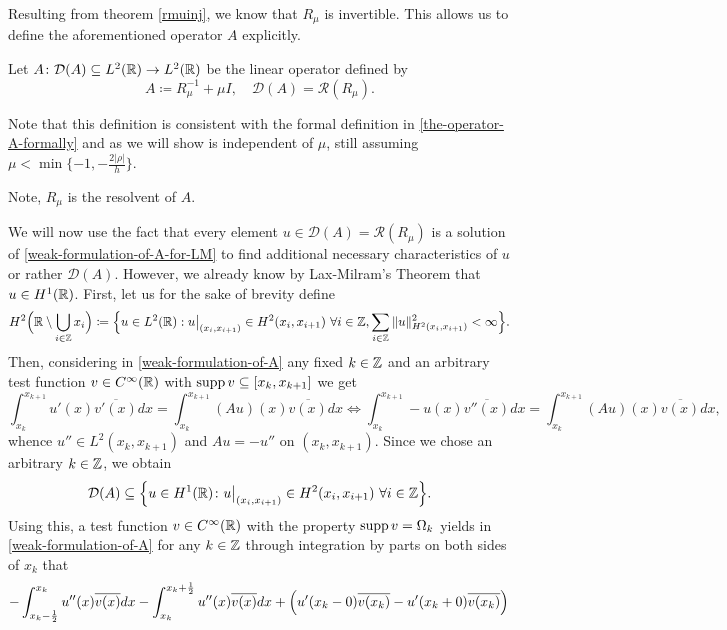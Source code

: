 Resulting from theorem \ref{rmuinj}, we know that $R_{\mu}$ is invertible. This allows us to define the aforementioned operator $A$ explicitly.
\begin{definition}
	Let $A \colon \mathcal{D}(A) \subseteq L^{2}(\mathbb{R}) \rightarrow L^{2}(\mathbb{R})$ be the linear operator defined by
	\[ A \coloneqq R_{\mu}^{-1} + \mu I, \quad \mathcal{D}(A) = \mathcal{R}(R_{\mu}). \]
\end{definition}
Note that this definition is consistent with the formal definition in \eqref{the-operator-A-formally} and as we will show is independent of $\mu$, still assuming $\mu < \min \{ -1, - \frac{2|\rho|}{h} \}$. 
\begin{remark}
	Note, $R_{\mu}$ is the resolvent of $A$.
\end{remark}
We will now use the fact that every element $u \in \mathcal{D}(A) = \mathcal{R}(R_{\mu})$ is a solution of \eqref{weak-formulation-of-A-for-LM} to find additional necessary  characteristics of $u$ or rather $\mathcal{D}(A)$. However, we already know by Lax-Milram's Theorem that $u \in H^{1}(\mathbb{R})$. First, let us for the sake of brevity define
\[ H^{2}\Big(\mathbb{R} \setminus \bigcup_{i \in \mathbb{Z}} x_{i} \Big) \coloneqq \Big\{ u\in L^{2}(\mathbb{R}) : u\big|_{(x_{i}, x_{i+1})} \in H^{2}(x_{i}, x_{i+1}) ~\forall i \in \mathbb{Z}, \sum_{i \in \mathbb{Z}} \|u\|^{2}_{H^{2}(x_{i}, x_{i+1})} < \infty \Big\}. \]
Then, considering in \eqref{weak-formulation-of-A} any fixed $k \in \mathbb{Z}$ and an arbitrary test function $v \in C^{\infty}(\mathbb{R})$ with $\operatorname{supp} v \subseteq [x_{k}, x_{k+1}]$ we get 
	\begin{equation}
		\int_{x_{k}}^{x_{k + 1}} u'(x) \overline{v'(x)} dx = \int_{x_{k}}^{x_{k+1}} \left(Au\right)(x) \overline{v(x)} dx \iff \int_{x_{k}}^{x_{k+1}} - u(x) \overline{v''(x)} dx = \int_{x_{k}}^{x_{k+1}} \left(Au\right)(x) \overline{v(x)} dx, \label{temp-link}
	\end{equation} 
whence $u'' \in L^{2}(x_{k}, x_{k + 1})$ and $A u = - u''$ on $(x_{k}, x_{k + 1})$. Since we chose an arbitrary $k \in \mathbb{Z}$, we obtain 
	$$ \mathcal{D}(A) \subseteq \Big\{ u \in H^{1}(\mathbb{R}) \colon u\big|_{(x_{i}, x_{i+1})} \in H^{2}(x_{i}, x_{i+1}) ~\forall i \in \mathbb{Z} \Big\}. $$
Using this, a test function $v \in C^{\infty}(\mathbb{R})$ with the property $\operatorname{supp} v = \Omega_{k}$ yields in \eqref{weak-formulation-of-A} for any $k \in \mathbb{Z}$ through integration by parts on both sides of $x_{k}$ that
	\[ - \int_{x_{k}-\frac{1}{2}}^{x_{k}} u''(x) \overline{v(x)} dx - \int_{x_{k}}^{x_{k} + \frac{1}{2}} u''(x) \overline{v(x)} dx + \left( u'(x_{k}-0) \overline{v(x_{k})} - u'(x_{k} + 0) \overline{v(x_{k})} \right) \\ \]
